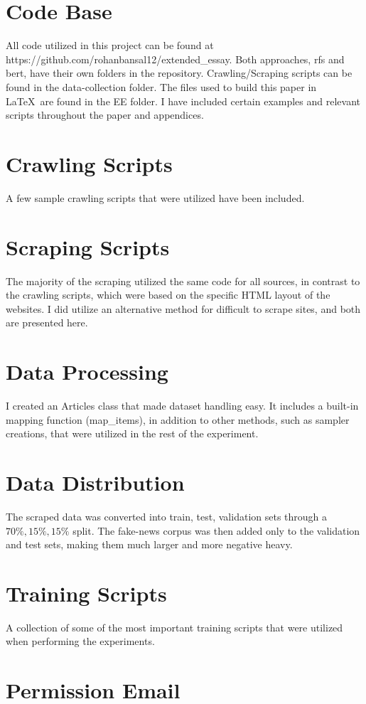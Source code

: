 \section{Code Base}
\label{appendix:code-base}
All code utilized in this project can be found at https://github.com/rohanbansal12/extended\_essay. Both approaches, \acrlong{rfs} and \acrshort{bert}, have their own folders in the repository. Crawling/Scraping scripts can be found in the data-collection folder. The files used to build this paper in \LaTeX\ are found in the EE folder. I have included certain examples and relevant scripts throughout the paper and appendices. 

\section{Crawling Scripts}
\label{appendix:crawling}
A few sample crawling scripts that were utilized have been included.


\section{Scraping Scripts}
\label{appendix:scraping}
The majority of the scraping utilized the same code for all sources, in contrast to the crawling scripts, which were based on the specific HTML layout of the websites. I did utilize an alternative method for difficult to scrape sites, and both are presented here.


\section{Data Processing}
\label{appendix:processing}
I created an Articles class that made dataset handling easy. It includes a built-in mapping function (map\_items), in addition to other methods, such as sampler creations, that were utilized in the rest of the experiment.


\section{Data Distribution}
\label{appendix:data-info}
The scraped data was converted into train, test, validation sets through a $70\%, 15\%, 15\%$ split. The fake-news corpus was then added only to the validation and test sets, making them much larger and more negative heavy.


\section{Training Scripts}
\label{appendix:training-scripts}
A collection of some of the most important training scripts that were utilized when performing the experiments.


\section{Permission Email}
\label{appendix:permission}
